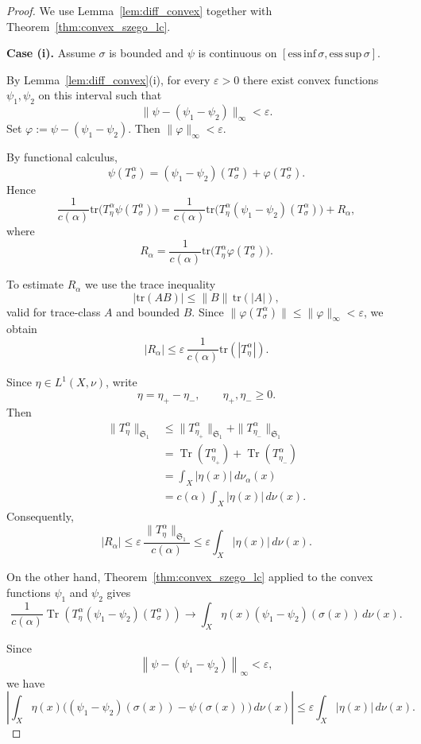 \documentclass[10pt,a4paper]{amsart}
\newcommand{\calF}{\mathcal{F}}
\newcommand{\tr}{\text{tr}} %
\begin{document}
\begin{proof}
We use Lemma~\ref{lem:diff_convex} together with
Theorem~\ref{thm:convex_szego_lc}.

\medskip
\noindent
\textbf{Case (i).}
Assume $\sigma$ is bounded and $\psi$ is continuous on
$[\mathrm{ess\,inf}\,\sigma,\mathrm{ess\,sup}\,\sigma]$.

By Lemma~\ref{lem:diff_convex}(i), for every $\varepsilon>0$
there exist convex functions $\psi_1,\psi_2$ on this interval such that
\[
\|\psi-(\psi_1-\psi_2)\|_\infty < \varepsilon.
\]
Set $\varphi := \psi-(\psi_1-\psi_2)$.
Then $\|\varphi\|_\infty < \varepsilon$.

By functional calculus,
\[
\psi(T_\sigma^\alpha)
=
(\psi_1-\psi_2)(T_\sigma^\alpha)
+
\varphi(T_\sigma^\alpha).
\]
Hence
\[
\frac{1}{c(\alpha)}
\tr\!\big(T_\eta^\alpha \psi(T_\sigma^\alpha)\big)
=
\frac{1}{c(\alpha)}
\tr\!\big(T_\eta^\alpha (\psi_1-\psi_2)(T_\sigma^\alpha)\big)
+
R_\alpha,
\]
where
\[
R_\alpha
=
\frac{1}{c(\alpha)}
\tr\!\big(T_\eta^\alpha \varphi(T_\sigma^\alpha)\big).
\]

To estimate $R_\alpha$ we use the trace inequality
\[
|\tr(AB)| \le \|B\|\, \tr(|A|),
\]
valid for trace-class $A$ and bounded $B$.
Since $\|\varphi(T_\sigma^\alpha)\|
\le \|\varphi\|_\infty < \varepsilon$,
we obtain
\[
|R_\alpha|
\le
\varepsilon \,
\frac{1}{c(\alpha)} \tr(|T_\eta^\alpha|).
\]

Since $\eta\in L^1(X,\nu)$, write
\[
\eta=\eta_+-\eta_-,
\qquad
\eta_+,\eta_-\geq0.
\]
Then
\[
\begin{aligned}
\|T_\eta^\alpha\|_{\mathfrak S_1}
&\leq
\|T_{\eta_+}^\alpha\|_{\mathfrak S_1}
+
\|T_{\eta_-}^\alpha\|_{\mathfrak S_1}\\
&=
\operatorname{Tr}(T_{\eta_+}^\alpha)
+
\operatorname{Tr}(T_{\eta_-}^\alpha)\\
&=
\int_X|\eta(x)|\,d\nu_\alpha(x)\\
&=
c(\alpha)\int_X|\eta(x)|\,d\nu(x).
\end{aligned}
\]
Consequently,
\[
|R_\alpha|
\leq
\varepsilon\,
\frac{\|T_\eta^\alpha\|_{\mathfrak S_1}}{c(\alpha)}
\leq
\varepsilon\int_X|\eta(x)|\,d\nu(x).
\]

On the other hand, Theorem~\ref{thm:convex_szego_lc} applied to the convex functions
$\psi_1$ and $\psi_2$ gives
\[
\frac{1}{c(\alpha)}
\operatorname{Tr}\!\left(
T_\eta^\alpha
(\psi_1-\psi_2)(T_\sigma^\alpha)
\right)
\longrightarrow
\int_X
\eta(x)(\psi_1-\psi_2)(\sigma(x))
\,d\nu(x).
\]

Since
\[
\left\|
\psi-(\psi_1-\psi_2)
\right\|_\infty<\varepsilon,
\]
we have
\[
\left|
\int_X
\eta(x)
\bigl((\psi_1-\psi_2)(\sigma(x))-\psi(\sigma(x))\bigr)
\,d\nu(x)
\right|
\leq
\varepsilon\int_X|\eta(x)|\,d\nu(x).
\]


\end{proof}
\end{document}

